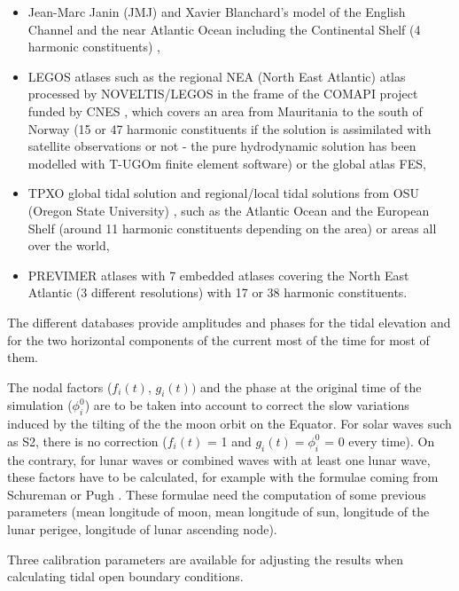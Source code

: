 \begin{itemize}
\item Jean-Marc Janin (JMJ) and Xavier Blanchard's model of the English
Channel and the near Atlantic Ocean including the Continental Shelf (4
harmonic constituents) \cite{jmj},

\item LEGOS atlases such as the regional NEA (North East Atlantic) atlas
processed by NOVELTIS/LEGOS in the frame of the COMAPI project funded by CNES
\cite{pairaud1}, \cite{pairaud2} \cite{legos} which covers an area from
Mauritania to the south of Norway (15 or 47 harmonic constituents if the
solution is assimilated with satellite observations or not - the pure
hydrodynamic solution has been modelled with T-UGOm finite element software)
or the global atlas FES,

\item TPXO global tidal solution and regional/local tidal solutions from OSU
(Oregon State University) \cite{osu}, such as the Atlantic Ocean and the
European Shelf (around 11 harmonic constituents depending on the area) or
areas all over the world,

\item PREVIMER atlases with 7 embedded atlases covering the North East
Atlantic (3 different resolutions) with 17 or 38 harmonic constituents.
\end{itemize}

The different databases provide amplitudes and phases for the tidal elevation
and for the two horizontal components of the current most of the time for most
of them. \newline

The nodal factors ($f_{i}(t)$, $g_{i}(t))$ and the phase at the original time
of the simulation ($\phi_{i}^{0}$) are to be taken into account to correct the
slow variations induced by the tilting of the the moon orbit on the Equator.
For solar waves such as S2, there is no correction ($f_{i}(t)$ = 1 and
$g_{i}(t) = \phi_{i}^{0}$ = 0 every time). On the contrary, for lunar waves or
combined waves with at least one lunar wave, these factors have to be
calculated, for example with the formulae coming from Schureman
\cite{schureman71} or Pugh \cite{pugh}. These formulae need the computation of
some previous parameters (mean longitude of moon, mean longitude of sun,
longitude of the lunar perigee, longitude of lunar ascending node).

Three calibration parameters are available for adjusting the results when
calculating tidal open boundary conditions.


